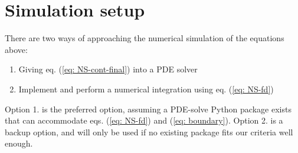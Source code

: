 \section{Simulation setup} \label{section: implementation}
There are two ways of approaching the numerical simulation of the equations above:
\begin{enumerate}
    \item Giving eq. (\ref{eq: NS-cont-final}) into a PDE solver
    \item Implement and perform a numerical integration using eq. (\ref{eq: NS-fd})
\end{enumerate}
Option 1. is the preferred option, assuming a PDE-solve Python package exists that can accommodate eqs. (\ref{eq: NS-fd}) and (\ref{eq: boundary}). Option 2. is a backup option, and will only be used if no existing package fits our criteria well enough.

